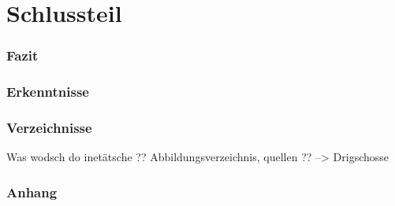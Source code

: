 \part{Schlussteil}



\section{Fazit} %


\section{Erkenntnisse}

\section{Verzeichnisse}

Was wodsch do inetätsche ?? Abbildungsverzeichnis, quellen ?? --> Drigschosse

\section{Anhang}